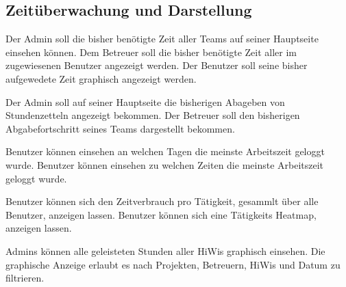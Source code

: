 \subsection{Zeitüberwachung und Darstellung}
    \begin{requirements}
        \begin{requirements}
             Der Admin soll die bisher benötigte Zeit aller Teams auf seiner Hauptseite einsehen können.
             Dem Betreuer soll die bisher benötigte Zeit aller im zugewiesenen Benutzer angezeigt werden.
             Der Benutzer soll seine bisher aufgewedete Zeit graphisch angezeigt werden.
        \end{requirements}

        \begin{requirements}
             Der Admin soll auf seiner Hauptseite die bisherigen Abageben von Stundenzetteln angezeigt bekommen.
             Der Betreuer soll den bisherigen Abgabefortschritt seines Teams dargestellt bekommen.
        \end{requirements}

        \begin{requirements}
             Benutzer können einsehen an welchen Tagen die meinste Arbeitszeit geloggt wurde.
             Benutzer können einsehen zu welchen Zeiten die meinste Arbeitszeit geloggt wurde.
        \end{requirements}

        \begin{requirements}
             Benutzer können sich den Zeitverbrauch pro Tätigkeit, gesammlt über alle Benutzer, anzeigen lassen.
             Benutzer können sich eine Tätigkeits Heatmap, anzeigen lassen.
        \end{requirements}
        
        \begin{requirements}
        	  Admins können alle geleisteten Stunden aller HiWis graphisch einsehen. 
        	  Die graphische Anzeige erlaubt es nach Projekten, Betreuern, HiWis und Datum zu filtrieren.
        \end{requirements}
       
    \end{requirements}

